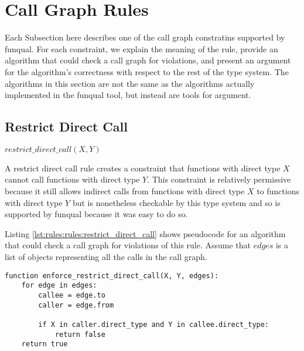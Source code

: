 \section{Call Graph Rules}\label{sec:rules:rules}


Each Subsection here describes one of the call graph constratins supported by funqual.  For each constraint, we explain the meaning of the rule, provide an algorithm that could check a call graph for violations, and present an argument for the algorithm's correctness with respect to the rest of the type system.  The algorithms in this section are not the same as the algorithms actually implemented in the funqual tool, but instead are tools for argument.  

\subsection{Restrict Direct Call}

\begin{center}
    $restrict\_direct\_call(X, Y)$
\end{center}

A restrict direct call rule creates a constraint that functions with direct type $X$ cannot call functions with direct type $Y$.  This constraint is relatively permissive because it still allows indirect calls from functions with direct type $X$ to functions with direct type $Y$ but is nonetheless checkable by this type system and so is supported by funqual because it was easy to do so.

Listing \ref{lst:rules:rules:restrict_direct_call} shows pseudocode for an algorithm that could check a call graph for violations of this rule.  Assume that $edges$ is a list of objects representing all the calls in the call graph.  

\noindent\begin{minipage}[t]{\linewidth}
\begin{lstlisting}[caption={Pseudocode for an algorithm that could check a $restrict\_direct\_call$ constraint.  This algorithm returns \lstinline{true} if the call graph respects the constraint and \lstinline{false} if the call graph violates it.},label={lst:rules:rules:restrict_direct_call}]
function enforce_restrict_direct_call(X, Y, edges):
    for edge in edges:
        callee = edge.to
        caller = edge.from

        if X in caller.direct_type and Y in callee.direct_type:
            return false
    return true
\end{lstlisting}
\end{minipage}

